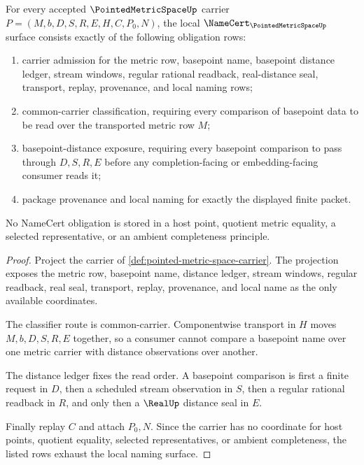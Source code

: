 \begin{theorem}
\label{thm:pointed-metric-space-namecert-obligations}
For every accepted $\PointedMetricSpaceUp$ carrier
$P=(M,b,D,S,R,E,H,C,P_0,N)$, the local
$\NameCert_{\PointedMetricSpaceUp}$ surface consists exactly of the following
obligation rows:
\begin{enumerate}
\item carrier admission for the metric row, basepoint name, basepoint distance
ledger, stream windows, regular rational readback, real-distance seal,
transport, replay, provenance, and local naming rows;
\item common-carrier classification, requiring every comparison of basepoint
data to be read over the transported metric row $M$;
\item basepoint-distance exposure, requiring every basepoint comparison to
pass through $D,S,R,E$ before any completion-facing or embedding-facing
consumer reads it;
\item package provenance and local naming for exactly the displayed finite
packet.
\end{enumerate}
No NameCert obligation is stored in a host point, quotient metric equality, a
selected representative, or an ambient completeness principle.
\end{theorem}
\begin{proof}
Project the carrier of \autoref{def:pointed-metric-space-carrier}. The
projection exposes the metric row, basepoint name, distance ledger, stream
windows, regular readback, real seal, transport, replay, provenance, and local
name as the only available coordinates.

The classifier route is common-carrier. Componentwise transport in $H$ moves
$M,b,D,S,R,E$ together, so a consumer cannot compare a basepoint name over one
metric carrier with distance observations over another.

The distance ledger fixes the read order. A basepoint comparison is first a
finite request in $D$, then a scheduled stream observation in $S$, then a
regular rational readback in $R$, and only then a $\RealUp$ distance seal in
$E$.

Finally replay $C$ and attach $P_0,N$. Since the carrier has no coordinate for
host points, quotient equality, selected representatives, or ambient
completeness, the listed rows exhaust the local naming surface.
\end{proof}

